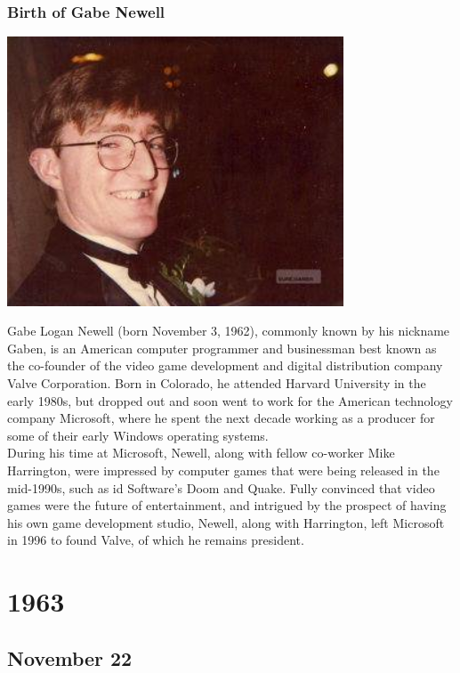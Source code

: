 \documentclass[11pt]{report}
\begin{document}
\subsection{Birth of Gabe Newell}
\vspace{2mm}\begin{center}\includegraphics[width=10cm]{./img/youngNewell.jpg}\end{center}
Gabe Logan Newell (born November 3, 1962), commonly known by his nickname Gaben, is an American computer programmer and businessman best known as the co-founder of the video game development and digital distribution company Valve Corporation. Born in Colorado, he attended Harvard University in the early 1980s, but dropped out and soon went to work for the American technology company Microsoft, where he spent the next decade working as a producer for some of their early Windows operating systems.\\
\indent During his time at Microsoft, Newell, along with fellow co-worker Mike Harrington, were impressed by computer games that were being released in the mid-1990s, such as id Software's Doom and Quake. Fully convinced that video games were the future of entertainment, and intrigued by the prospect of having his own game development studio, Newell, along with Harrington, left Microsoft in 1996 to found Valve, of which he remains president.

\chapter{1963}
\section{November 22}
\end{document}
